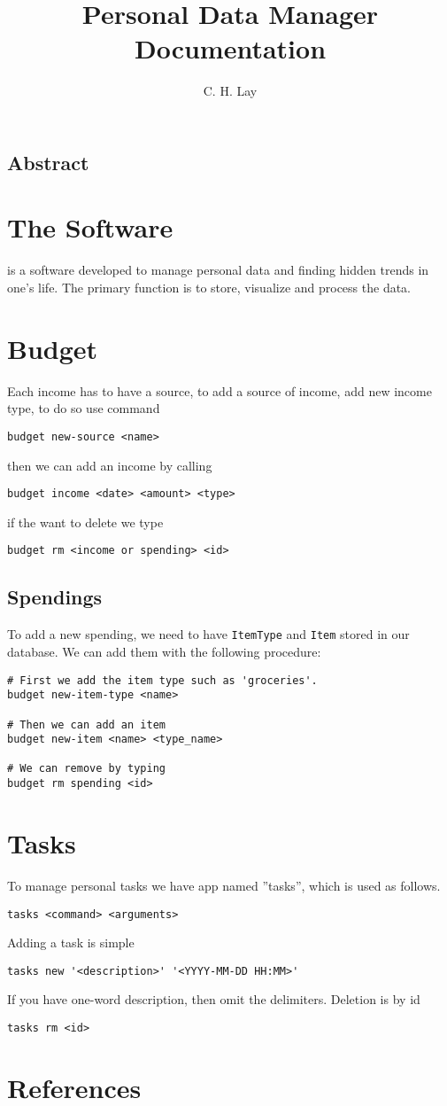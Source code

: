 \documentclass{article}
\title{Personal Data Manager\\ \Large{Documentation}}
\author{C. H. Lay}
\begin{document}
\maketitle
\tableofcontents

\subsection*{Abstract}


\section{The Software}
 is a software developed to manage personal data and finding hidden trends in one's life. The primary function is to store, visualize and process the data.

\section{Budget}
Each income has to have a source, to add a source of income, add new income type, to do so use command
\begin{lstlisting}
budget new-source <name>
\end{lstlisting}
then we can add an income by calling
\begin{lstlisting}
budget income <date> <amount> <type>
\end{lstlisting}
if the want to delete we type
\begin{lstlisting}
budget rm <income or spending> <id>
\end{lstlisting}

\subsection*{Spendings}
To add a new spending, we need to have \texttt{ItemType} and \texttt{Item} stored in our database.
We can add them with the following procedure:
\begin{lstlisting}
# First we add the item type such as 'groceries'.
budget new-item-type <name>

# Then we can add an item
budget new-item <name> <type_name>

# We can remove by typing
budget rm spending <id>
\end{lstlisting}

\section{Tasks}
To manage personal tasks we have app named ''tasks'', which is used as follows.
\begin{lstlisting}
tasks <command> <arguments>
\end{lstlisting}
Adding a task is simple
\begin{lstlisting}
tasks new '<description>' '<YYYY-MM-DD HH:MM>'
\end{lstlisting}
If you have one-word description, then omit the delimiters.
Deletion is by id
\begin{lstlisting}
tasks rm <id>
\end{lstlisting}
\section{References}
\end{document}
